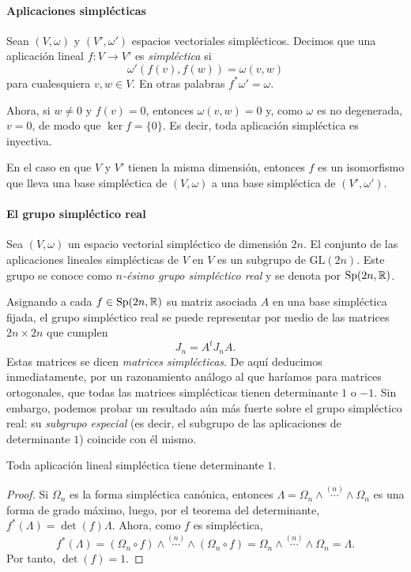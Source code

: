 \paragraph{\bf Aplicaciones simplécticas}\mbox{}

  Sean $(V,\omega)$ y $(V',\omega')$ espacios vectoriales simplécticos. Decimos que una aplicación lineal $f:V \rightarrow V'$ es \emph{simpléctica} si
  \[
    \omega'(f(v),f(w)) = \omega(v,w)
  \]
  para cualesquiera $v,w \in V$. En otras palabras $f^*\omega'=\omega$.

Ahora, si $w\neq 0$ y $f(v)=0$, entonces $\omega(v,w)=0$ y, como $\omega$ es no degenerada, $v=0$, de modo que $\ker f=\{0\}$. Es decir, toda aplicación simpléctica es inyectiva.

En el caso en que $V$ y $V'$ tienen la misma dimensión, entonces $f$ es un isomorfismo que lleva una base simpléctica de $(V,\omega)$ a una base simpléctica de $(V',\omega')$. 

\paragraph{\bf El grupo simpléctico real}\mbox{}

  Sea $(V,\omega)$ un espacio vectorial simpléctico de dimensión $2n$. El conjunto de las aplicaciones lineales simplécticas de $V$ en $V$ es un subgrupo de $\mathrm{GL}(2n)$. Este grupo se conoce como \emph{$n$-ésimo grupo simpléctico real} y se denota por $\mathrm{Sp}(2n,\mathbb{R})$.

  Asignando a cada $f\in \mathrm{Sp}(2n,\mathbb{R})$ su matriz asociada $A$ en una base simpléctica fijada, el grupo simpléctico real se puede representar por medio de las matrices $2n\times 2n$ que cumplen
  \begin{equation*}
    J_n=A^tJ_n A.
  \end{equation*}
  Estas matrices se dicen \emph{matrices simplécticas}.
  De aquí deducimos inmediatamente, por un razonamiento análogo al que haríamos para matrices ortogonales, que todas las matrices simplécticas tienen determinante $1$ o $-1$. Sin embargo, podemos probar un resultado aún más fuerte sobre el grupo simpléctico real: su \emph{subgrupo especial} (es decir, el subgrupo de las aplicaciones de determinante $1$) coincide con él mismo.
\begin{prop}
  Toda aplicación lineal simpléctica tiene determinante $1$.
\end{prop}
\begin{proof}
  Si $\Omega_n$ es la forma simpléctica canónica, entonces $\Lambda=\Omega_n \wedge \overset{(n)}{\cdots} \wedge \Omega_n$ es una forma de grado máximo, luego, por el teorema del determinante, $f^*(\Lambda)=\det(f) \Lambda$. Ahora, como $f$ es simpléctica, 
  \begin{equation*}
    f^*(\Lambda) = (\Omega_n \circ f) \wedge \overset{(n)}{\cdots} \wedge (\Omega_n \circ f)=\Omega_n \wedge \overset{(n)}{\cdots} \wedge \Omega_n = \Lambda.
  \end{equation*}
  Por tanto, $\det(f)=1$.
\end{proof}
